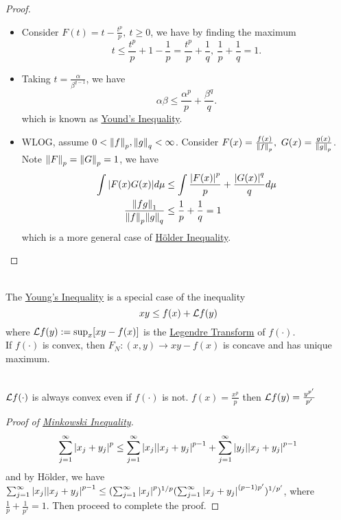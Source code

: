 \begin{remark}
\begin{proof}
\begin{itemize}
    \item Consider $F(t) = t - \frac{t^p}{p},\ t \geq 0$, we have by finding the maximum
    \begin{equation*}
        t \leq \frac{t^p}{p} + 1 - \frac{1}{p} = \frac{t^p}{p} + \frac{1}{q},\ \frac{1}{p} + \frac{1}{q} = 1.
    \end{equation*}
    \item Taking $t = \frac{\alpha}{\beta^{q - 1}}$, we have
    \begin{equation*}
        \alpha \beta \leq \frac{\alpha^p}{p} + \frac{\beta^q}{q}.
    \end{equation*}
    which is known as \underline{Yound's Inequality}.
    \item WLOG, assume $0 < \norm{f}_p, \norm{g}_q < \infty$. Consider $F(x) = \frac{f(x)}{\norm{f}_p},\ G(x) = \frac{g(x)}{\norm{g}_p}$. Note $\norm{F}_p = \norm{G}_p = 1$, we have
    \begin{align*}
        \int \abs{F(x) G(x)} d\mu &\leq \int \frac{\abs{F(x)}^p}{p} + \frac{\abs{G(x)}^q}{q} d\mu\\
        \frac{\norm{fg}_1}{\norm{f}_p \norm{g}_q} &\leq \frac{1}{p} + \frac{1}{q} = 1
    \end{align*}
    which is a more general case of \underline{H\"older Inequality}. 
\end{itemize}
\end{proof}
\begin{remark}\ \\
    The \underline{Young's Inequality} is a special case of the inequality $$xy \leq f(x) + \mathcal{L} f(y)$$
where $\mathcal{L} f(y) := \sup_x [xy - f(x)]$ is the \underline{Legendre Transform} of $f(\cdot)$.\\
If $f(\cdot)$ is convex, then $F_N: (x,y) \to xy - f(x)$ is concave and has unique maximum.
\end{remark}
\begin{remark}\ \\
    $\mathcal{L} f(\cdot)$ is always convex even if $f(\cdot)$ is not. $f(x) = \frac{x^p}{p}$ then $\mathcal{L} f(y) = \frac{y^{p'}}{p'}$
\end{remark}
\begin{proof}[Proof of \underline{Minkowski Inequality}]\
\begin{equation*}
    \sum_{j = 1}^\infty \abs{x_j + y_j}^p \leq \sum_{j=1}^\infty \abs{x_j} \abs{x_j + y_j}^{p-1} + \sum_{j= 1}^\infty \abs{y_j} \abs{x_j + y_j}^{p-1}
\end{equation*}
and by H\"older, we have $\sum_{j = 1}^\infty \abs{x_j} \abs{x_j + y_j}^{p-1} \leq (\sum_{j= 1}^\infty  \abs{x_j}^p)^{1/p} (\sum_{j = 1}^\infty \abs{x_j + y_j}^{(p - 1) p'})^{1 /p'}$, where $\frac{1}{p} + \frac{1}{p'} = 1$. Then proceed to complete the proof.
\end{proof}
\end{remark}

